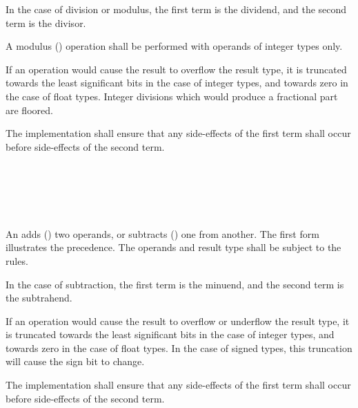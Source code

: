 \specsubsubitem
In the case of division or modulus, the first term is the dividend, and the
second term is the divisor.

\specsubsubitem
A modulus (\terminal{\%}) operation shall be performed with operands of integer
types only.

\specsubsubitem
If an operation would cause the result to overflow the result type, it is
truncated towards the least significant bits in the case of integer types, and
towards zero in the case of float types. Integer divisions which would produce
a fractional part are floored.

\specsubsubitem
The implementation shall ensure that any side-effects of the first term shall
occur before side-effects of the second term.


\begin{grammar}
 \\
	 \\
	 \terminal{+}  \\
	 \terminal{-}  \\
\end{grammar}

\specsubsubitem
An  adds (\terminal{+}) two operands, or
subtracts (\terminal{-}) one from another. The first form illustrates the
precedence. The operands and result type shall be subject to the  rules.

\specsubsubitem
In the case of subtraction, the first term is the minuend, and the second term
is the subtrahend.

\specsubsubitem
If an operation would cause the result to overflow or underflow the result
type, it is truncated towards the least significant bits in the case of integer
types, and towards zero in the case of float types. In the case of signed
types, this truncation will cause the sign bit to change.

\specsubsubitem
The implementation shall ensure that any side-effects of the first term shall
occur before side-effects of the second term.


\begin{grammar}
 \\
	 \\
	 \terminal{\textless{}\textless{}}  \\
	 \terminal{\textgreater{}\textgreater{}}  \\
\end{grammar}

